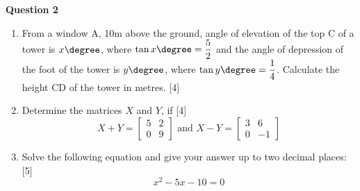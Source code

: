 \newpage
\par
\noindent
\textbf{Question 2}\\
\begin{enumerate}[label=(\roman*)]

    \item From a window A, 10m above the ground, angle of elevation of 
        the top C of a tower is $x\degree$, where $\tan x\degree = \dfrac52$ 
        and the angle of depression of the foot of the tower is $y\degree$,
        where $\tan y\degree = \dfrac14$. Calculate the height CD of the 
        tower in metres.
        \hfill[4]

    \item Determine the matrices $X$ and $Y$, if \hfill [4]
        \[
            X + Y = \begin{bmatrix*} 5 & 2 \\ 0 & 9 \end{bmatrix*}
            \text{ and }
            X - Y = \begin{bmatrix*} 3 & 6 \\ 0 & -1 \end{bmatrix*}
        \]

    \item Solve the following equation and give your answer up to 
        two decimal places: \hfill [5]
        \[
            x^2 - 5x - 10 = 0
        \]

\end{enumerate}

